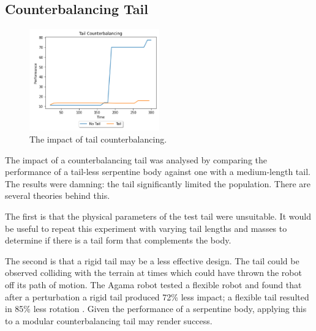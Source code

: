 \documentclass{article}
\begin{document}
\subsection{Counterbalancing Tail}
\label{sec:Tail Res}
\begin{figure}
    \centering
    \vspace*{-5mm}
    \includegraphics[width=0.5\textwidth]{tailResults}
    \vspace*{-7mm}
    \caption{The impact of tail counterbalancing.}
\end{figure}
The impact of a counterbalancing tail was analysed by comparing the performance of a tail-less serpentine body against one with a medium-length tail. The results were damning: the tail significantly limited the population. There are several theories behind this.

The first is that the physical parameters of the test tail were unsuitable. It would be useful to repeat this experiment with varying tail lengths and masses to determine if there is a tail form that complements the body. 

The second is that a rigid tail may be a less effective design. The tail could be observed colliding with the terrain at times which could have thrown the robot off its path of motion. The Agama robot tested a flexible robot and found that after a perturbation a rigid tail produced 72\% less impact; a flexible tail resulted in 85\% less rotation . Given the performance of a serpentine body, applying this to a modular counterbalancing tail may render success. 

\newpage
\end{document}
